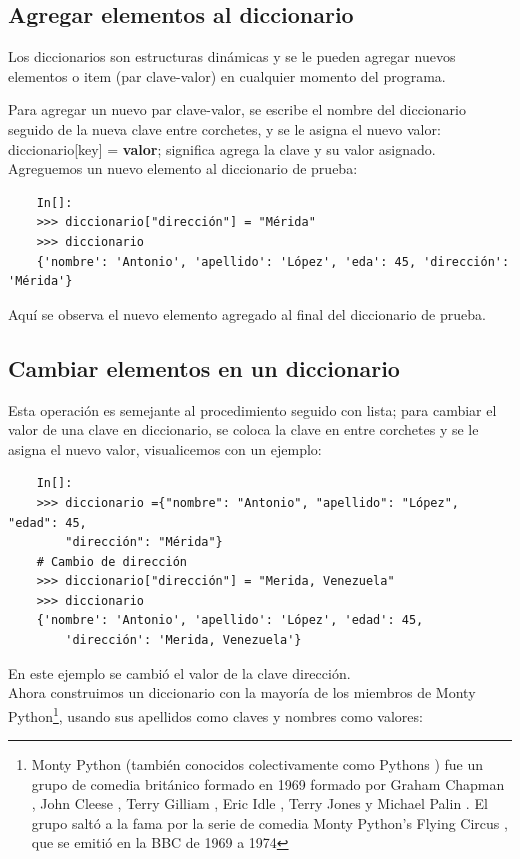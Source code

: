 \subsection{Agregar elementos al diccionario}


Los diccionarios son estructuras dinámicas y se le pueden agregar nuevos elementos o item (par clave-valor)  en cualquier momento del programa.

Para agregar un nuevo par clave-valor, se escribe el nombre del diccionario seguido de la nueva clave entre corchetes, y se le asigna el nuevo valor: {\ttfamily diccionario[key] = {\bf{valor}}};  significa agrega la clave y su valor asignado.\\     

Agreguemos un nuevo elemento al diccionario de prueba: 
\begin{lstlisting}
	In[]:	
	>>> diccionario["dirección"] = "Mérida"
	>>> diccionario
	{'nombre': 'Antonio', 'apellido': 'López', 'eda': 45, 'dirección': 'Mérida'}
\end{lstlisting}

\noindent Aquí se observa  el nuevo elemento agregado al final del diccionario de prueba.


\subsection{Cambiar elementos en un diccionario}


Esta operación es semejante al procedimiento seguido con lista; para cambiar el valor de una clave en   diccionario, se coloca la clave en entre corchetes y se le asigna el nuevo valor, visualicemos con un ejemplo:

\begin{lstlisting}
	In[]:	
	>>> diccionario ={"nombre": "Antonio", "apellido": "López", "edad": 45, 
		"dirección": "Mérida"}
	# Cambio de dirección
	>>> diccionario["dirección"] = "Merida, Venezuela"
	>>> diccionario
	{'nombre': 'Antonio', 'apellido': 'López', 'edad': 45, 
		'dirección': 'Merida, Venezuela'}
\end{lstlisting}

En este ejemplo se cambió el valor de la clave {\ttfamily dirección}.\\


Ahora construimos un diccionario con la mayoría de los miembros de Monty Python{\footnote{Monty Python (también conocidos colectivamente como Pythons ) fue un grupo de comedia británico formado en 1969 formado por Graham Chapman , John Cleese , Terry Gilliam , Eric Idle , Terry Jones y Michael Palin . El grupo saltó a la fama por la serie de comedia Monty Python's Flying Circus , que se emitió en la BBC de 1969 a 1974}}, usando sus apellidos
como claves y nombres como valores:

